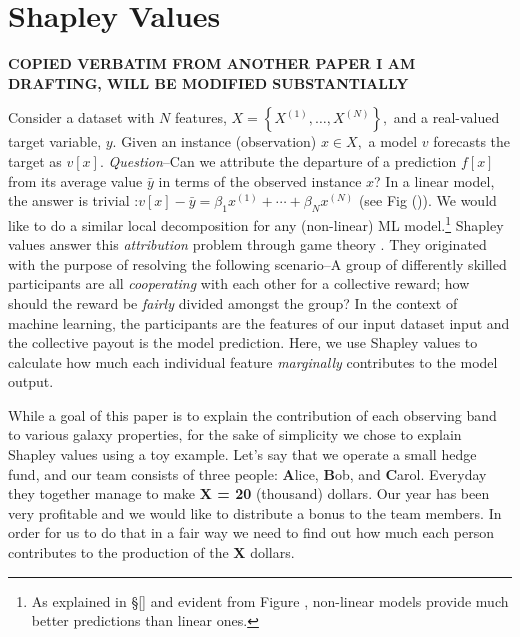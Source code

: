 
\section{Shapley Values}\label{sec:shapley_values} \textbf{COPIED VERBATIM FROM ANOTHER PAPER I AM DRAFTING, WILL BE MODIFIED SUBSTANTIALLY}

Consider a dataset with $N$ features, $X=\left\{X^{(1)}, \ldots, X^{(N)}\right\},$ and a real-valued target variable, $y$. Given an instance (observation) $x \in X,$ a model $v$ forecasts the target as $v[x]$. \emph{Question}--Can we attribute the departure of a prediction $f[x]$ from its average value $\bar{y}$ in terms of the observed instance $x$? In a linear model, the answer is trivial :$v[x]-\bar{y}=\beta_{1} x^{(1)}+\cdots+\beta_{N} x^{(N)}$ (see Fig ()). We would like to do a similar local decomposition for any (non-linear) ML model.\footnote{As explained in \S\ref{} and evident from Figure {}, non-linear models provide much better predictions than linear ones.} Shapley values answer this \emph{attribution} problem through game theory \citep{shapley}. They originated with the purpose of resolving the following scenario--A group of differently skilled participants are all \emph{cooperating} with each other for a collective reward; how should the reward be \emph{fairly} divided amongst the group? In the context of machine learning, the participants are the features of our input dataset input and the collective payout is the model prediction. Here, we use Shapley values to calculate how much each individual feature \emph{marginally} contributes to the model output.

While a goal of this paper is to explain the contribution of each observing band to various galaxy properties, for the sake of simplicity we chose to explain Shapley values using a toy example. Let's say that we operate a small hedge fund, and our team consists of three people: \textbf{A}lice, \textbf{B}ob, and \textbf{C}arol. Everyday they together manage to make \textbf{X = 20} (thousand) dollars. Our year has been very profitable and we would like to distribute a bonus to the team members. In order for us to do that in a fair way we need to find out how much each person contributes to the production of the \textbf{X} dollars.

